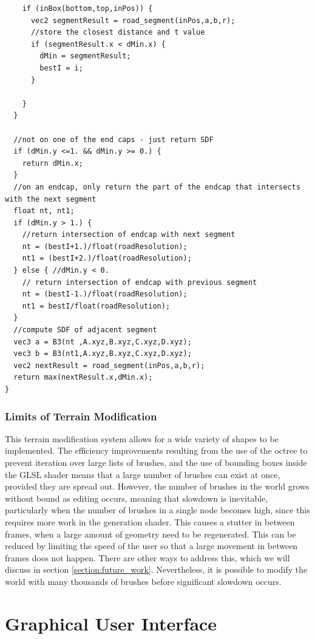 \documentclass[11pt]{article}
\begin{document}
\begin{lstlisting}
    if (inBox(bottom,top,inPos)) {
      vec2 segmentResult = road_segment(inPos,a,b,r);
      //store the closest distance and t value
      if (segmentResult.x < dMin.x) {
        dMin = segmentResult;
        bestI = i;
      }

    }
  }
    
  //not on one of the end caps - just return SDF
  if (dMin.y <=1. && dMin.y >= 0.) {
    return dMin.x;
  }
  //on an endcap, only return the part of the endcap that intersects with the next segment
  float nt, nt1;
  if (dMin.y > 1.) {
    //return intersection of endcap with next segment
    nt = (bestI+1.)/float(roadResolution);
    nt1 = (bestI+2.)/float(roadResolution);
  } else { //dMin.y < 0.
    // return intersection of endcap with previous segment
    nt = (bestI-1.)/float(roadResolution);
    nt1 = bestI/float(roadResolution);
  }
  //compute SDF of adjacent segment
  vec3 a = B3(nt ,A.xyz,B.xyz,C.xyz,D.xyz);
  vec3 b = B3(nt1,A.xyz,B.xyz,C.xyz,D.xyz);
  vec2 nextResult = road_segment(inPos,a,b,r);
  return max(nextResult.x,dMin.x);
}
\end{lstlisting}


\subsubsection{Limits of Terrain Modification}
\label{edit_limits}
This terrain modification system allows for a wide variety of shapes to be implemented. The efficiency improvements resulting from the use of the octree to prevent iteration over large lists of brushes, and the use of bounding boxes inside the GLSL shader means that a large number of brushes can exist at once, provided they are spread out. However, the number of brushes in the world grows without bound as editing occurs, meaning that slowdown is inevitable, particularly when the number of brushes in a single node becomes high, since this requires more work in the generation shader. This causes a stutter in between frames, when a large amount of geometry need to be regenerated. This can be reduced by limiting the speed of the user so that a large movement in between frames does not happen. There are other ways to address this, which we will discuss in section \ref{section:future_work}. Nevertheless, it is possible to modify the world with many thousands of brushes before significant slowdown occurs.

\section{Graphical User Interface}
\end{document}

